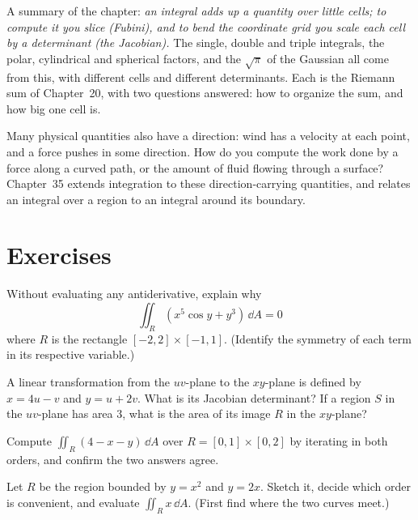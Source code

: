 \begin{aestheticbox}
A summary of the chapter: \emph{an integral adds up a quantity over little
cells; to compute it you slice (Fubini), and to bend the coordinate grid you
scale each cell by a determinant (the Jacobian).} The single, double and triple
integrals, the polar, cylindrical and spherical factors, and the $\sqrt\pi$ of
the Gaussian all come from this, with different cells and different
determinants. Each is the Riemann sum of Chapter~20, with two questions
answered: how to organize the sum, and how big one cell is.

Many physical quantities also have a direction: wind has a velocity at each
point, and a force pushes in some direction. How do you compute the work done by
a force along a curved path, or the amount of fluid flowing through a surface?
Chapter~35 extends integration to these direction-carrying quantities, and
relates an integral over a region to an integral around its boundary.
\end{aestheticbox}

\section{Exercises}
\label{ch34:exercises}

\begin{exercise}
\label{ch34:exr-mental-sym}
Without evaluating any antiderivative, explain why
\[
  \iint_R (x^5 \cos y + y^3)\,\dd A = 0
\]
where $R$ is the rectangle $[-2,2]\times[-1,1]$. (Identify the symmetry of each term in its respective variable.)
\end{exercise}

\begin{exercise}
\label{ch34:exr-mental-scaling}
A linear transformation from the $uv$-plane to the $xy$-plane is defined by
$x = 4u - v$ and $y = u + 2v$.
What is its Jacobian determinant? If a region $S$ in the $uv$-plane has area $3$,
what is the area of its image $R$ in the $xy$-plane?
\end{exercise}

\begin{exercise}
\label{ch34:exr-rect}
Compute $\displaystyle\iint_R (4-x-y)\,\dd A$ over $R=[0,1]\times[0,2]$ by
iterating in both orders, and confirm the two answers agree.
\end{exercise}

\begin{exercise}
\label{ch34:exr-curves}
Let $R$ be the region bounded by $y=x^2$ and $y=2x$. Sketch it, decide which
order is convenient, and evaluate $\displaystyle\iint_R x\,\dd A$. (First find
where the two curves meet.)
\end{exercise}

